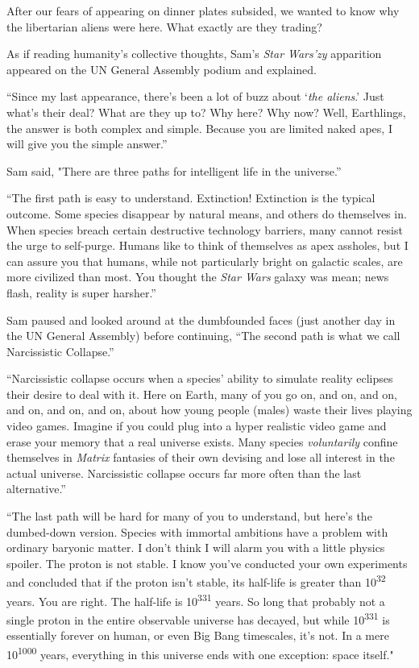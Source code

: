 After our fears of appearing on dinner plates subsided, we wanted to
know why the libertarian aliens were here. What exactly are they
trading?

As if reading humanity's collective thoughts, Sam's \emph{Star Wars'zy}
apparition appeared on the UN General Assembly podium and explained.

``Since my last appearance, there's been a lot of buzz about `\emph{the
aliens}.' Just what's their deal? What are they up to? Why here? Why
now? Well, Earthlings, the answer is both complex and simple. Because
you are limited naked apes, I will give you the simple answer.''

Sam said, "There are three paths for intelligent life in the universe.''

``The first path is easy to understand. Extinction! Extinction is the
typical outcome. Some species disappear by natural means, and others do
themselves in. When species breach certain destructive technology
barriers, many cannot resist the urge to self-purge. Humans like to
think of themselves as apex assholes, but I can assure you that humans,
while not particularly bright on galactic scales, are more civilized
than most. You thought the \emph{Star Wars} galaxy was mean; news flash,
reality is super harsher.''

Sam paused and looked around at the dumbfounded faces (just another day
in the UN General Assembly) before continuing, ``The second path is what
we call Narcissistic Collapse.''

``Narcissistic collapse occurs when a species' ability to simulate
reality eclipses their desire to deal with it. Here on Earth, many of
you go on, and on, and on, and on, and on, and on, about how young
people (males) waste their lives playing video games. Imagine if you
could plug into a hyper realistic video game and erase your memory that
a real universe exists. Many species \emph{voluntarily} confine
themselves in \emph{Matrix} fantasies of their own devising and lose all
interest in the actual universe. Narcissistic collapse occurs far more
often than the last alternative.''

``The last path will be hard for many of you to understand, but here's
the dumbed-down version. Species with immortal ambitions have a problem
with ordinary baryonic matter. I don't think I will alarm you with a
little physics spoiler. The proton is not stable. I know you've
conducted your own experiments and concluded that if the proton isn't
stable, its half-life is greater than 10\textsuperscript{32} years. You
are right. The half-life is 10\textsuperscript{331} years. So long that
probably not a single proton in the entire observable universe has
decayed, but while 10\textsuperscript{331} is essentially forever on
human, or even Big Bang timescales, it's not. In a mere
10\textsuperscript{1000} years, everything in this universe ends with
one exception: space itself."

